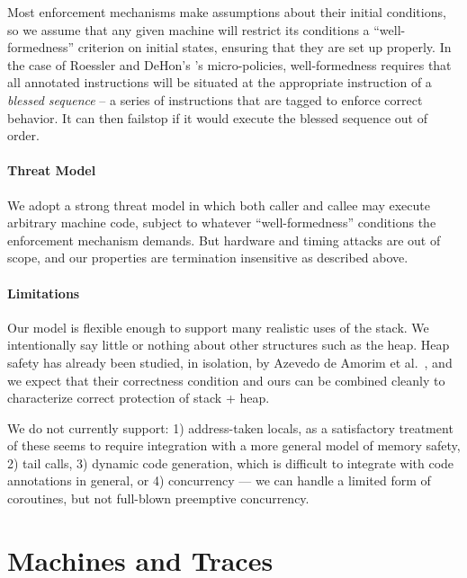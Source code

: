 \documentclass[10pt,conference]{ieeetran}%
\theoremstyle{definition}
\begin{document}
Most enforcement mechanisms make assumptions about their initial conditions,
so we assume that any given machine will restrict its conditions a ``well-formedness''
criterion on initial states, ensuring that they are set up properly. In the case of
Roessler and DeHon's \cite{DBLP:conf/sp/RoesslerD18}'s micro-policies, well-formedness
requires that all annotated instructions will be situated at the appropriate instruction
of a {\em blessed sequence} -- a series of instructions that are tagged to enforce correct
behavior. It can then failstop if it would
execute the blessed sequence out of order.

\paragraph*{Threat Model}

We adopt a strong threat model in which both caller and callee may execute
arbitrary machine code, subject to whatever ``well-formedness'' conditions the
enforcement mechanism demands. But hardware and timing attacks are out of scope,
and our properties are termination insensitive as described above.

\paragraph*{Limitations}

Our model is flexible enough to support many realistic uses of the stack.
We intentionally say little or nothing about other structures
such as the heap.  Heap safety has already been studied, in isolation,
by Azevedo de Amorim et al.~\cite{DBLP:conf/post/AmorimHP18}, and we expect that their correctness condition and ours can be
combined cleanly to characterize correct protection of stack + heap.

We do not currently support:
1) address-taken locals, as a satisfactory treatment of these seems to require
integration with a more general model of memory safety,
2) tail calls,
3) dynamic code generation, which is difficult to integrate with code annotations in general, or
4) concurrency --- we can handle a limited form of coroutines, but
  not full-blown preemptive concurrency.

\section{Machines and Traces}
\label{sec:prelim}

\end{document}
